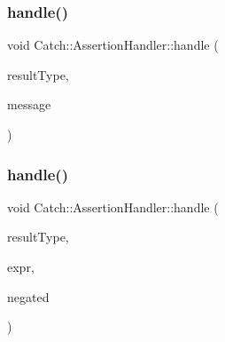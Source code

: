 \mbox{\label{classCatch_1_1AssertionHandler_a50c299532997985f6fce55dc63545aa4}} 
\subsubsection{\texorpdfstring{handle()}{handle()}\hspace{0.1cm}{\footnotesize\ttfamily [4/6]}}
{\footnotesize\ttfamily void Catch\+::\+Assertion\+Handler\+::handle (\begin{DoxyParamCaption}\item[{\mbox{\hyperlink{structCatch_1_1ResultWas_a624e1ee3661fcf6094ceef1f654601ef}{Result\+Was\+::\+Of\+Type}}}]{result\+Type,  }\item[{\mbox{\hyperlink{classCatch_1_1StringRef}{String\+Ref}} const \&}]{message }\end{DoxyParamCaption})}

\mbox{\label{classCatch_1_1AssertionHandler_a3878e2f677cfc46bb91511969f81db5a}} 
\subsubsection{\texorpdfstring{handle()}{handle()}\hspace{0.1cm}{\footnotesize\ttfamily [5/6]}}
{\footnotesize\ttfamily void Catch\+::\+Assertion\+Handler\+::handle (\begin{DoxyParamCaption}\item[{\mbox{\hyperlink{structCatch_1_1ResultWas_a624e1ee3661fcf6094ceef1f654601ef}{Result\+Was\+::\+Of\+Type}}}]{result\+Type,  }\item[{\mbox{\hyperlink{structCatch_1_1ITransientExpression}{I\+Transient\+Expression}} const $\ast$}]{expr,  }\item[{bool}]{negated }\end{DoxyParamCaption})}

\mbox{\label{classCatch_1_1AssertionHandler_ac45dca96196b397b3e587650bf6b1a65}} 
